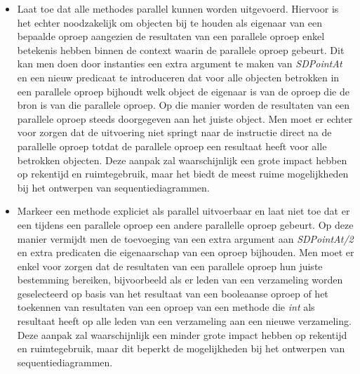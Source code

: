 \begin{itemize}
	\item Laat toe dat alle methodes parallel kunnen worden uitgevoerd. Hiervoor is het echter noodzakelijk om objecten bij te houden als eigenaar van een bepaalde oproep aangezien de resultaten van een parallele oproep enkel betekenis hebben binnen de context waarin de parallele oproep gebeurt. Dit kan men doen door instanties een extra argument te maken van \textit{SDPointAt} en een nieuw predicaat te introduceren dat voor alle objecten betrokken in een parallele oproep bijhoudt welk object de eigenaar is van de oproep die de bron is van die parallele oproep. Op die manier worden de resultaten van een parallele oproep steeds doorgegeven aan het juiste object. Men moet er echter voor zorgen dat de uitvoering niet springt naar de instructie direct na de parallelle oproep totdat de parallele oproep een resultaat heeft voor alle betrokken objecten. Deze aanpak zal waarschijnlijk een grote impact hebben op rekentijd en ruimtegebruik, maar het biedt de meest ruime mogelijkheden bij het ontwerpen van sequentiediagrammen.
	\item Markeer een methode expliciet als parallel uitvoerbaar en laat niet toe dat er een tijdens een parallele oproep een andere parallelle oproep gebeurt. Op deze manier vermijdt men de toevoeging van een extra argument aan \textit{SDPointAt/2} en extra predicaten die eigenaarschap van een oproep bijhouden. Men moet er enkel voor zorgen dat de resultaten van een parallele oproep hun juiste bestemming bereiken, bijvoorbeeld als er leden van een verzameling worden geselecteerd op basis van het resultaat van een booleaanse oproep of het toekennen van resultaten van een oproep van een methode die \textit{int} als resultaat heeft op alle leden van een verzameling aan een nieuwe verzameling. Deze aanpak zal waarschijnlijk een minder grote impact hebben op rekentijd en ruimtegebruik, maar dit beperkt de mogelijkheden bij het ontwerpen van sequentiediagrammen.
\end{itemize}